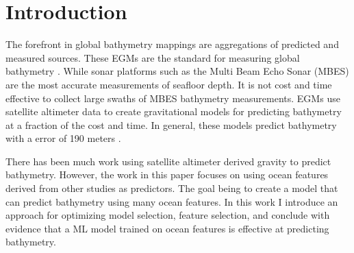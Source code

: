 
\section{Introduction}
\setlength{\parindent}{10ex}
The forefront in global bathymetry mappings are aggregations of predicted and measured sources. 
These \ac{EGM}s are the standard for measuring global bathymetry \cite{becker2009global}\cite{smith1994bathymetric}\cite{smith1997global}\cite{smith2010planning}.
While sonar platforms such as the Multi Beam Echo Sonar (MBES) \cite{farr1980multibeam} are the most accurate measurements of seafloor depth.
It is not cost and time effective to collect large swaths of \ac{MBES} bathymetry measurements.
\ac{EGM}s use satellite altimeter data to create gravitational models for predicting bathymetry at a fraction of the cost and time.
In general, these models predict bathymetry with a error of 190 meters \cite{jena2012prediction}.

\par
There has been much work using satellite altimeter derived gravity to predict bathymetry.
However, the work in this paper focuses on using ocean features derived from other studies as predictors.
The goal being to create a model that can predict bathymetry using many ocean features.
In this work I introduce an approach for optimizing model selection, feature selection, and conclude with evidence that a \ac{ML} model trained on ocean features is effective at predicting bathymetry.